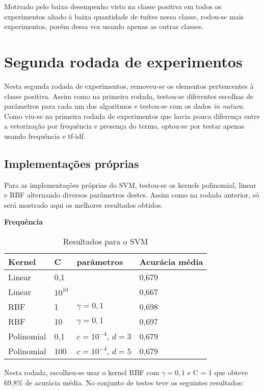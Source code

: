 Motivado pelo baixo desempenho visto na classe positiva em todos os experimentos aliado à baixa
quantidade de tuítes nessa classe, rodou-se mais experimentos, porém dessa vez usando apenas as
outras classes.

\section{Segunda rodada de experimentos}

Nesta segunda rodada de experimentos, removeu-se os elementos pertencentes à classe positiva.
Assim como na primeira rodada, testou-se diferentes escolhas de parâmetros para cada um dos
algoritmos e testou-se com os dados \textit{in natura}. Como viu-se na primeira rodada de experimentos
que havia pouca diferença entre a vetorização por frequência e presença do termo, optou-se por testar
apenas usando frequência e tf-idf.

\subsection{Implementações próprias}

Para as implementações próprias do SVM, testou-se os kernels polinomial, linear e RBF alternando
diversos parâmetros destes. Assim como na rodada anterior, só será mostrado aqui os melhores resultados
obtidos. 

\textbf{Frequência}

\begin{table}[H]
	\centering
	\caption{Resultados para o SVM}
	\begin{tabular}{l l l l}
		\hline
		Kernel & C & parâmetros & Acurácia média \\
		\hline
		Linear & 0,1 & & 0,679 \\
		\hline
		Linear & $10^{10}$ & & 0,667 \\
		\hline
		RBF & 1 & $\gamma = 0,1$ & 0,698 \\
		\hline
		RBF & 10 & $\gamma = 0,1$ & 0,697 \\
		\hline
		Polinomial & 0,1 & $c = 10^{-4}$, $d = 3$ & 0,679 \\
		\hline
		Polinomial & 100 & $c = 10^{-4}$, $d = 5$ & 0,679 \\
		\hline
	\end{tabular}
\end{table}

Nesta rodada, escolheu-se usar o kernel RBF com $\gamma = 0,1$ e C = 1 que obteve 69,8\% de acurácia média. No
conjunto de testes teve os seguintes resultados:

